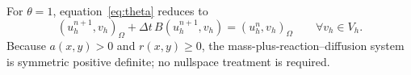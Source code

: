 \documentclass[11pt]{article}
\begin{document}
For $\theta=1$, equation~\eqref{eq:theta} reduces to
\begin{equation}
    (u_h^{n+1},v_h)_\Omega
    +\Delta t\,B(u_h^{n+1},v_h)
    =(u_h^n,v_h)_\Omega
    \qquad\forall v_h\in V_h.
\end{equation}
Because $a(x,y)>0$ and $r(x,y)\geq0$, the mass-plus-reaction--diffusion
system is symmetric positive definite; no nullspace treatment is required.
\end{document}
